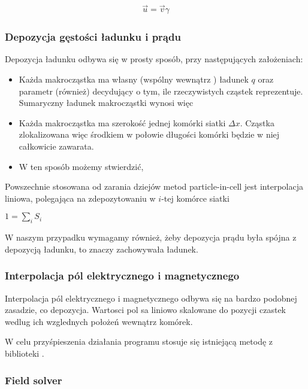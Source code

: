 {    \begin{align}
        \vec{u} = \vec{v} \gamma
        \label{eqn:gamma-transformation}
    \end{align}
    \subsubsection{Depozycja gęstości ładunku i prądu} 
    Depozycja ładunku odbywa się w prosty sposób, przy następujących założeniach:
    \begin{itemize}
        \item Każda makrocząstka ma własny (wspólny wewnątrz ) ładunek $q$ oraz parametr  (również) 
            decydujący o tym, ile rzeczywistych cząstek reprezentuje. Sumaryczny ładunek makrocząstki wynosi więc 
        \item Każda makrocząstka ma szerokość jednej komórki siatki $\Delta x$. Cząstka zlokalizowana więc środkiem
            w połowie długości komórki będzie w niej całkowicie zawarata.
        \item W ten sposób możemy stwierdzić, 
    \end{itemize}

    Powszechnie stosowana od zarania dziejów metod particle-in-cell 
    jest interpolacja liniowa, polegająca na zdepozytowaniu w $i$-tej komórce siatki 

    $1 = \sum_i S_i$ 

    W naszym przypadku wymagamy również, żeby depozycja prądu była spójna z depozycją ładunku, to znaczy
    zachowywała ładunek. 

    \subsubsection{Interpolacja pól elektrycznego i magnetycznego}
    Interpolacja pól elektrycznego i magnetycznego odbywa się na bardzo podobnej zasadzie, co depozycja.
    Wartosci pol sa liniowo skalowane do pozycji czastek wedlug ich wzglednych położeń wewnątrz komórek.

    W celu przyśpieszenia działania programu stosuje się istniejącą metodę
     z biblioteki . 
    \subsubsection{Field solver} 

}
